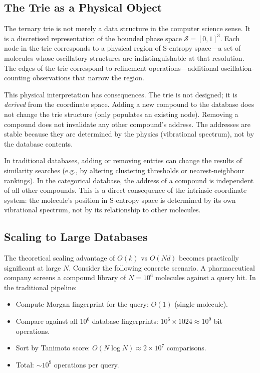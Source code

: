 \documentclass[11pt,twocolumn,a4paper]{article}
\theoremstyle{definition}
\theoremstyle{remark}
\newcommand{\Sspace}{\mathcal{S}}
\begin{document}
\subsection{The Trie as a Physical Object}

The ternary trie is not merely a data structure in the computer science sense. It is a discretised representation of the bounded phase space $\Sspace = [0,1]^3$. Each node in the trie corresponds to a physical region of S-entropy space---a set of molecules whose oscillatory structures are indistinguishable at that resolution. The edges of the trie correspond to refinement operations---additional oscillation-counting observations that narrow the region.

This physical interpretation has consequences. The trie is not designed; it is \emph{derived} from the coordinate space. Adding a new compound to the database does not change the trie structure (only populates an existing node). Removing a compound does not invalidate any other compound's address. The addresses are stable because they are determined by the physics (vibrational spectrum), not by the database contents.

In traditional databases, adding or removing entries can change the results of similarity searches (e.g., by altering clustering thresholds or nearest-neighbour rankings). In the categorical database, the address of a compound is independent of all other compounds. This is a direct consequence of the intrinsic coordinate system: the molecule's position in S-entropy space is determined by its own vibrational spectrum, not by its relationship to other molecules.

\subsection{Scaling to Large Databases}

The theoretical scaling advantage of $O(k)$ vs $O(Nd)$ becomes practically significant at large $N$. Consider the following concrete scenario. A pharmaceutical company screens a compound library of $N = 10^6$ molecules against a query hit. In the traditional pipeline:

\begin{itemize}[nosep]
\item Compute Morgan fingerprint for the query: $O(1)$ (single molecule).
\item Compare against all $10^6$ database fingerprints: $10^6 \times 1024 \approx 10^9$ bit operations.
\item Sort by Tanimoto score: $O(N \log N) \approx 2 \times 10^7$ comparisons.
\item Total: $\sim 10^9$ operations per query.
\end{itemize}
\end{document}
